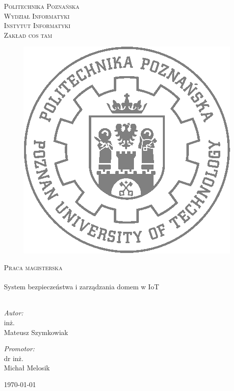 \begin{titlepage}
	\begin{center}
		\textsc{\LARGE Politechnika Poznańska}\\[0.3cm] 
		\textsc{\large Wydział Informatyki}\\[0.3cm]
		\textsc{\large Instytut Informatyki}\\[0.3cm]
		\textsc{\large Zakład cos tam}\\[0.3cm]
		\begin{figure}[!ht]
		\centering
		\includegraphics[scale=0.5]{pictures/logoPP.png}
		\end{figure}
		\textsc{\Large Praca magisterska}\\[0.5cm]
		\HRule \\[0.4cm]
		{ \huge  System bezpieczeństwa i zarządzania domem w IoT\\[0.4cm] }
		\HRule \\[2.5cm]
		\noindent
		\begin{minipage}{0.4\textwidth}
			\begin{flushleft} 
				\large \emph{Autor:}\\ inż. 
				\\Mateusz Szymkowiak
			\end{flushleft}
		\end{minipage}%
		\begin{minipage}{0.4\textwidth}
			\begin{flushright} \large
				\emph{Promotor:} \\ \hfill dr inż. 
				\\Michał Melosik
				
			\end{flushright}
		\end{minipage}
		
		\vfill
		
		{\large \today}
		
		
	\end{center}

\end{titlepage}




